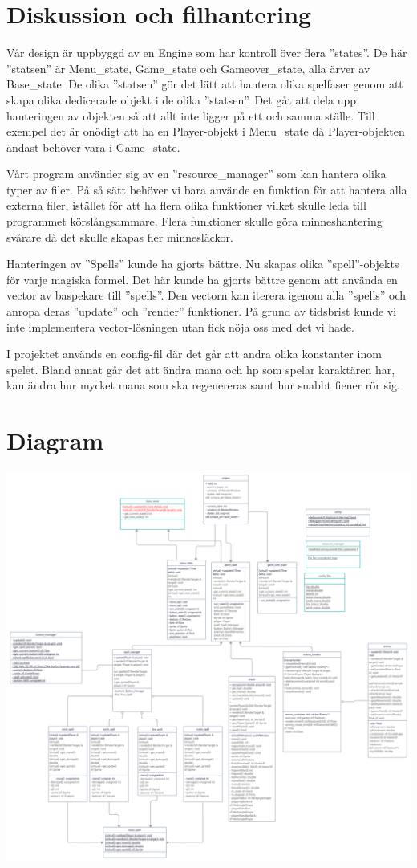 \documentclass[12pt]{TDP005mall}
\begin{document}
\section{Diskussion och filhantering}
Vår design är uppbyggd av en Engine som har kontroll över flera ''states''. De här ''statsen'' är Menu\_state, Game\_state och Gameover\_state, alla ärver av Base\_state. De olika ''statsen'' gör det lätt att hantera olika spelfaser genom att skapa olika dedicerade objekt i de olika ''statsen''. Det gåt att dela upp hanteringen av objekten så att allt inte ligger på ett och samma ställe. Till exempel det är onödigt att ha en Player-objekt i Menu\_state då Player-objekten ändast behöver vara i Game\_state.

Vårt program använder sig av en ''resource\_manager'' som kan hantera olika typer av filer. På så sätt behöver vi bara använde en funktion för att hantera alla externa filer, istället för att ha flera olika funktioner vilket skulle leda till programmet körslångsammare. Flera funktioner skulle göra minneshantering svårare då det skulle skapas fler minnesläckor. 

Hanteringen av ''Spells'' kunde ha gjorts bättre. Nu skapas olika ''spell''-objekts för varje magiska formel. Det här kunde ha gjorts bättre genom att använda en vector av baspekare till ''spells''. Den vectorn kan iterera igenom alla ''spells'' och anropa deras ''update'' och ''render''  funktioner. På grund av tidsbrist kunde vi inte implementera vector-lösningen utan fick nöja oss med det vi hade.

I projektet används en config-fil där det går att andra olika konstanter inom spelet. Bland annat går det att ändra mana och hp som spelar karaktären har, kan ändra hur mycket mana som ska regenereras samt hur snabbt fiener rör sig. 

\newpage
\section{Diagram}
\includegraphics[scale=0.12]{uml_diagram.png}
\end{document}
